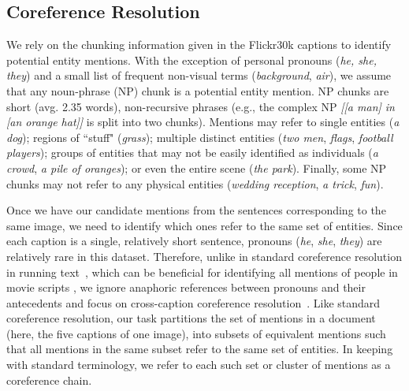 \documentclass[twocolumn]{svjour3}
\begin{document}
\subsection{Coreference Resolution}  \label{sec:coref}

We rely on the chunking information given in the Flickr30k captions \citep{young2014image} to identify potential entity mentions. With the exception of personal pronouns (\textit{he, she, they}) and a small list of frequent non-visual terms (\textit{background}, \textit{air}), we assume that any noun-phrase (NP) chunk is a potential entity mention. NP chunks are short (avg. 2.35 words), non-recursive phrases (e.g., the complex NP \textit{[[a man] in [an orange hat]]} is split into two chunks). Mentions may refer to single entities (\textit{a dog}); regions of ``stuff" (\textit{grass}); multiple distinct entities (\textit{two men}, \textit{flags}, \textit{football players}); groups of entities that may not be easily identified as individuals ({\em a crowd}, \textit{a pile of oranges}); or even the entire scene (\textit{the park}). Finally, some NP chunks may not refer to any physical entities (\textit{wedding reception}, \textit{a trick}, \textit{fun}).  

Once we have our candidate mentions from the sentences corresponding to the same image, we need to identify which ones refer to the same set of entities. Since each caption is a single, relatively short sentence, pronouns (\textit{he}, \textit{she}, \textit{they}) are relatively rare in this dataset. Therefore, unlike in standard coreference resolution in running text~\citep{soon2001machine}, which can be beneficial for identifying all mentions of people in movie scripts \citep{RamanathanJLF14}, we ignore anaphoric references between pronouns and their antecedents and focus on cross-caption coreference resolution~\citep{hodosh2010cross}.  Like standard coreference resolution, our task partitions the set of mentions  in a document (here, the five captions of one image), into subsets of equivalent mentions such that all mentions in the same subset  refer to the same set of entities. In keeping with standard terminology, we refer to each such set or cluster of mentions  as a coreference chain. 
\end{document}
